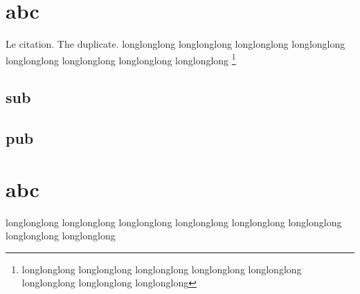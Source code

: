 \documentclass[first=firstname,last=lastname,company=comp,location=Dresden]{baarticle}
\begin{document}
    \section{abc}
    Le citation.
    The duplicate.
    longlonglong longlonglong longlonglong longlonglong longlonglong longlonglong longlonglong longlonglong
    \footnote{longlonglong longlonglong longlonglong longlonglong longlonglong longlonglong longlonglong longlonglong}
    \subsection{sub}
    \subsection{pub}
    \section{abc}
    \clearpage
    \printbibliography[heading=bibintoc]
    longlonglong longlonglong longlonglong longlonglong longlonglong longlonglong longlonglong longlonglong
    \clearpage
\end{document}
